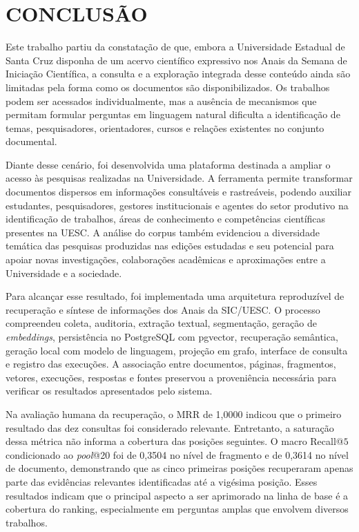 

\chapter{CONCLUSÃO}

Este trabalho partiu da constatação de que, embora a Universidade Estadual de Santa Cruz disponha de um acervo científico expressivo nos Anais da Semana de Iniciação Científica, a consulta e a exploração integrada desse conteúdo ainda são limitadas pela forma como os documentos são disponibilizados. Os trabalhos podem ser acessados individualmente, mas a ausência de mecanismos que permitam formular perguntas em linguagem natural dificulta a identificação de temas, pesquisadores, orientadores, cursos e relações existentes no conjunto documental.

Diante desse cenário, foi desenvolvida uma plataforma destinada a ampliar o acesso às pesquisas realizadas na Universidade. A ferramenta permite transformar documentos dispersos em informações consultáveis e rastreáveis, podendo auxiliar estudantes, pesquisadores, gestores institucionais e agentes do setor produtivo na identificação de trabalhos, áreas de conhecimento e competências científicas presentes na UESC. A análise do corpus também evidenciou a diversidade temática das pesquisas produzidas nas edições estudadas e seu potencial para apoiar novas investigações, colaborações acadêmicas e aproximações entre a Universidade e a sociedade.

Para alcançar esse resultado, foi implementada uma arquitetura reproduzível de recuperação e síntese de informações dos Anais da SIC/UESC. O processo compreendeu coleta, auditoria, extração textual, segmentação, geração de \textit{embeddings}, persistência no PostgreSQL com pgvector, recuperação semântica, geração local com modelo de linguagem, projeção em grafo, interface de consulta e registro das execuções. A associação entre documentos, páginas, fragmentos, vetores, execuções, respostas e fontes preservou a proveniência necessária para verificar os resultados apresentados pelo sistema.

Na avaliação humana da recuperação, o MRR de 1,0000 indicou que o primeiro resultado das dez consultas foi considerado relevante. Entretanto, a saturação dessa métrica não informa a cobertura das posições seguintes. O macro Recall@$5$ condicionado ao \textit{pool}@20 foi de 0,3504 no nível de fragmento e de 0,3614 no nível de documento, demonstrando que as cinco primeiras posições recuperaram apenas parte das evidências relevantes identificadas até a vigésima posição. Esses resultados indicam que o principal aspecto a ser aprimorado na linha de base é a cobertura do ranking, especialmente em perguntas amplas que envolvem diversos trabalhos.

